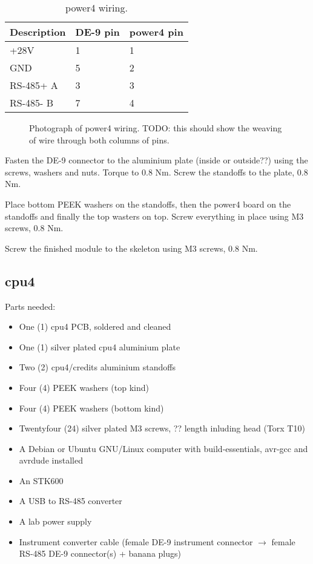 \documentclass{article}
\begin{document}
\begin{table}[H]
\begin{centering}
\begin{tabular}{|l|l|l|}
\hline
{\bf Description} & {\bf DE-9 pin}    & {\bf power4 pin}\\ \hline
+28V              & 1                 & 1 \\ \hline
GND               & 5                 & 2 \\ \hline
RS-485+ A         & 3                 & 3 \\ \hline
RS-485- B         & 7                 & 4 \\ \hline
\end{tabular}
\caption{power4 wiring.}
\label{power4_table}
\end{centering}
\end{table}


\begin{figure}
\centering
\caption{Photograph of power4 wiring.
TODO: this should show the weaving of wire through both columns of pins.}
\label{power4_wires}
\end{figure}

Fasten the DE-9 connector to the aluminium plate (inside or outside??) using the screws, washers and nuts.
Torque to 0.8 Nm.
Screw the standoffs to the plate, 0.8 Nm.

Place bottom PEEK washers on the standoffs, then the power4 board on the standoffs and finally the top wasters on top.
Screw everything in place using M3 screws, 0.8 Nm.

Screw the finished module to the skeleton using M3 screws, 0.8 Nm.

\subsection{cpu4}

Parts needed:

\begin{itemize}
\item One (1) cpu4 PCB, soldered and cleaned
\item One (1) silver plated cpu4 aluminium plate
\item Two (2) cpu4/credits aluminium standoffs
\item Four (4) PEEK washers (top kind)
\item Four (4) PEEK washers (bottom kind)
\item Twentyfour (24) silver plated M3 screws, ?? length inluding head (Torx T10)
\item A Debian or Ubuntu GNU/Linux computer with build-essentials, avr-gcc and avrdude installed
\item An STK600
\item A USB to RS-485 converter
\item A lab power supply
\item Instrument converter cable (female DE-9 instrument connector $\rightarrow$ female RS-485 DE-9 connector(s) + banana plugs)
\end{itemize}
\end{document}
